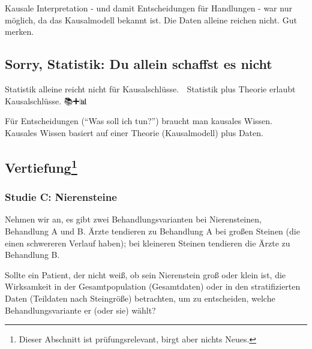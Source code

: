 \documentclass[
  a4paper,
  DIV=11]{scrreprt}
\theoremstyle{definition}
\theoremstyle{remark}
\begin{document}
Kausale Interpretation - und damit Entscheidungen für Handlungen - war
nur möglich, da das Kausalmodell bekannt ist. Die Daten alleine reichen
nicht. Gut merken.

\hypertarget{sorry-statistik-du-allein-schaffst-es-nicht}{%
\subsection{Sorry, Statistik: Du allein schaffst es
nicht}\label{sorry-statistik-du-allein-schaffst-es-nicht}}

Statistik alleine reicht nicht für Kausalschlüsse. 🧟 Statistik plus
Theorie erlaubt Kausalschlüsse. 📚➕📊 🟰 🤩

\begin{tcolorbox}[enhanced jigsaw, leftrule=.75mm, left=2mm, bottomrule=.15mm, opacityback=0, coltitle=black, colbacktitle=quarto-callout-important-color!10!white, opacitybacktitle=0.6, rightrule=.15mm, toptitle=1mm, colback=white, colframe=quarto-callout-important-color-frame, arc=.35mm, toprule=.15mm, breakable, titlerule=0mm, bottomtitle=1mm, title=\textcolor{quarto-callout-important-color}{\faExclamation}\hspace{0.5em}{Wichtig}]
Für Entscheidungen (``Was soll ich tun?'') braucht man kausales Wissen.
Kausales Wissen basiert auf einer Theorie (Kausalmodell) plus Daten.
\end{tcolorbox}

\hypertarget{vertiefung-3}{%
\subsection[Vertiefung]{\texorpdfstring{Vertiefung\footnote{Dieser
  Abschnitt ist prüfungsrelevant, birgt aber nichts Neues.}}{Vertiefung}}\label{vertiefung-3}}

\hypertarget{studie-c-nierensteine}{%
\subsubsection{Studie C: Nierensteine}\label{studie-c-nierensteine}}

Nehmen wir an, es gibt zwei Behandlungsvarianten bei Nierensteinen,
Behandlung A und B. Ärzte tendieren zu Behandlung A bei großen Steinen
(die einen schwereren Verlauf haben); bei kleineren Steinen tendieren
die Ärzte zu Behandlung B.

Sollte ein Patient, der nicht weiß, ob sein Nierenstein groß oder klein
ist, die Wirksamkeit in der Gesamtpopulation (Gesamtdaten) oder in den
stratifizierten Daten (Teildaten nach Steingröße) betrachten, um zu
entscheiden, welche Behandlungsvariante er (oder sie) wählt?
\end{document}
